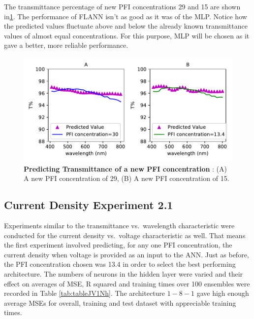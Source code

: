 \documentclass[]{article}
\begin{document}
The transmittance percentage of new PFI concentrations 29 and 15 are shown in\ref{fig:transflannnew}. The performance of FLANN isn't as good as it was of the MLP. Notice how the predicted values fluctuate above and below the already known transmittance values of almost equal concentrations. For this purpose, MLP will be chosen as it gave a better, more reliable performance.

\begin{figure}
\centering
\includegraphics{Report_files/figure-latex/transflannnew-1.pdf}
\caption{\label{fig:transflannnew}\textbf{Predicting Transmittance of a new PFI concentration }: (A) A new PFI concentration of 29, (B) A new PFI concentration of 15.}
\end{figure}

\newpage

\hypertarget{current-density-experiment-2.1}{%
\subsection{Current Density Experiment 2.1}\label{current-density-experiment-2.1}}

Experiments similar to the transmittance vs.~wavelength characteristic were conducted for the current density vs.~voltage characteristic as well. That means the first experiment involved predicting, for any one PFI concentration, the current density when voltage is provided as an input to the ANN. Just as before, the PFI concentration chosen was 13.4 in order to select the best performing architecture. The numbers of neurons in the hidden layer were varied and their effect on averages of MSE, R squared and training times over 100 ensembles were recorded in Table \ref{tab:tableJV1Nh}. The architecture \({1-8-1}\) gave high enough average MSEs for overall, training and test dataset with appreciable training times.
\end{document}
